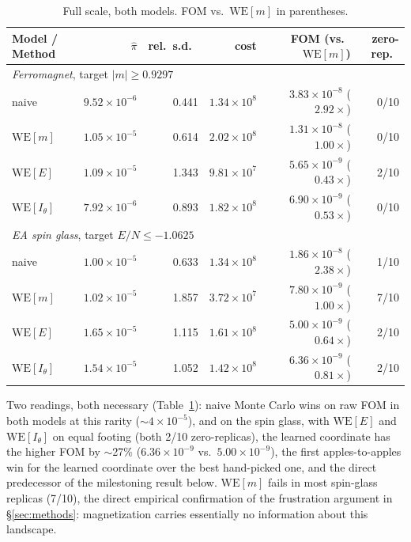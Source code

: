 \documentclass[a4paper,fleqn]{cas-sc}
\begin{document}
\begin{table}[H]
\centering\small
\caption{Full scale, both models. FOM vs.\ $\mathrm{WE}[m]$ in parentheses.}
\label{tab:prefix}
\begin{tabular}{lrrrrr}
	\toprule
	Model / Method & $\hat\pi$ & rel.\ s.d.\ & cost & FOM (vs.\ $\mathrm{WE}[m]$) & zero-rep.\ \\
	\midrule
	\multicolumn{6}{l}{\emph{Ferromagnet}, target $|m|\ge0.9297$} \\
	naive & $9.52\times10^{-6}$ & 0.441 & $1.34\times10^{8}$ & $3.83\times10^{-8}$ ($2.92\times$) & 0/10 \\
	$\mathrm{WE}[m]$ & $1.05\times10^{-5}$ & 0.614 & $2.02\times10^{8}$ & $1.31\times10^{-8}$ ($1.00\times$) & 0/10 \\
	$\mathrm{WE}[E]$ & $1.09\times10^{-5}$ & 1.343 & $9.81\times10^{7}$ & $5.65\times10^{-9}$ ($0.43\times$) & 2/10 \\
	$\mathrm{WE}[I_\theta]$ & $7.92\times10^{-6}$ & 0.893 & $1.82\times10^{8}$ & $6.90\times10^{-9}$ ($0.53\times$) & 0/10 \\
	\multicolumn{6}{l}{\emph{EA spin glass}, target $E/N\le-1.0625$} \\
	naive & $1.00\times10^{-5}$ & 0.633 & $1.34\times10^{8}$ & $1.86\times10^{-8}$ ($2.38\times$) & 1/10 \\
	$\mathrm{WE}[m]$ & $1.02\times10^{-5}$ & 1.857 & $3.72\times10^{7}$ & $7.80\times10^{-9}$ ($1.00\times$) & 7/10 \\
	$\mathrm{WE}[E]$ & $1.65\times10^{-5}$ & 1.115 & $1.61\times10^{8}$ & $5.00\times10^{-9}$ ($0.64\times$) & 2/10 \\
	$\mathrm{WE}[I_\theta]$ & $1.54\times10^{-5}$ & 1.052 & $1.42\times10^{8}$ & $6.36\times10^{-9}$ ($0.81\times$) & 2/10 \\
	\bottomrule
\end{tabular}
\end{table}

Two readings, both necessary (Table~\ref{tab:prefix}): naive Monte Carlo wins on raw FOM in both models at this
rarity ($\sim\!4\times10^{-5}$), and on the spin glass, with $\mathrm{WE}[E]$ and
$\mathrm{WE}[I_\theta]$ on equal footing (both 2/10 zero-replicas), the learned
	coordinate has the higher FOM by $\sim$27\% ($6.36\times10^{-9}$ vs.\ $5.00\times10^{-9}$),
the first apples-to-apples win for the learned coordinate over the best hand-picked
one, and the direct predecessor of the milestoning result below. $\mathrm{WE}[m]$ fails in
most spin-glass replicas (7/10), the direct empirical confirmation of the frustration
argument in \S\ref{sec:methods}: magnetization carries essentially no information about
this landscape.
\end{document}
